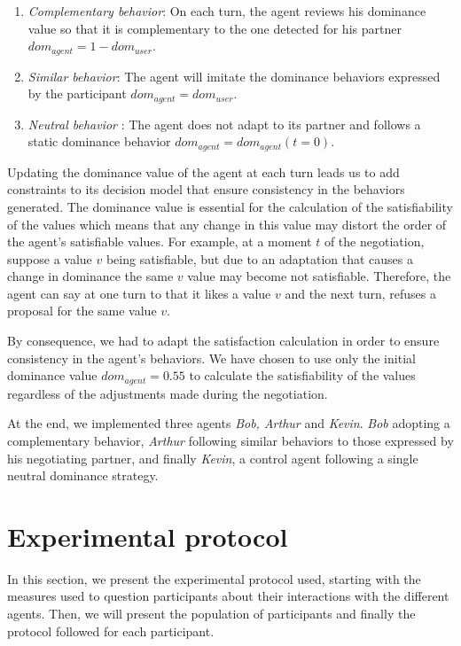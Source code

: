 \documentclass{llncs}
\begin{document}
\begin{enumerate}
	\item \textit{Complementary behavior}: On each turn, the agent reviews his dominance value so that it is complementary to the one detected for his partner $dom_{agent}=1-dom_{user}$.
	
	\item \textit{Similar behavior}: The agent will imitate the dominance behaviors expressed by the participant $dom_{agent} = dom_{user}$.
	
	\item \textit{Neutral behavior} : The agent does not adapt to its partner and follows a static dominance behavior $dom_{agent} = dom_{agent} (t=0)$.
	
	
\end{enumerate}

Updating the dominance value of the agent at each turn leads us to add constraints to its decision model that ensure consistency in the behaviors generated. 
The dominance value is essential for the calculation of the satisfiability of the values which means that any change in this value may distort the order of the agent's satisfiable values.
For example, at a moment $t$ of the negotiation, suppose a value $v$ being satisfiable, but due to an adaptation that causes a change in dominance the same $v$ value may become not satisfiable. Therefore, the agent can say at one turn to that it likes a value $v$ and the next turn, refuses a proposal for the same value $v$.

By consequence, we had to adapt the satisfaction calculation in order to ensure consistency in the agent's behaviors. We have chosen to use only the initial dominance value $dom_{agent} = 0.55$ to calculate the satisfiability of the values regardless of the adjustments made during the negotiation.

At the end, we implemented three agents \emph{Bob, Arthur} and \emph{Kevin}. \emph{Bob} adopting a complementary behavior, \emph{Arthur} following similar behaviors to those expressed by his negotiating partner, and finally \emph{Kevin}, a control agent following a single neutral dominance strategy. 

\section{Experimental protocol}
\label{sec:procedure}
In this section, we present the experimental protocol used, starting with the measures used to question participants about their interactions with the different agents. Then, we will present the population of participants and finally the protocol followed for each participant. 
\end{document}
